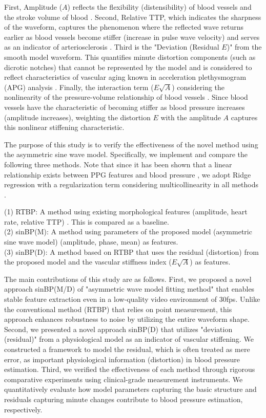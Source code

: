 \documentclass[fleqn,10pt,twocolumn]{AROB}
\begin{document}
First, Amplitude ($A$) reflects the flexibility (distensibility) of blood vessels and the stroke volume of blood \cite{ref3,ref11}.
Second, Relative TTP, which indicates the sharpness of the waveform, captures the phenomenon where the reflected wave returns earlier as blood vessels become stiffer (increase in pulse wave velocity) and serves as an indicator of arteriosclerosis \cite{ref6,ref14}.
Third is the "Deviation (Residual $E$)" from the smooth model waveform. This quantifies minute distortion components (such as dicrotic notches) that cannot be represented by the model and is considered to reflect characteristics of vascular aging known in acceleration plethysmogram (APG) analysis \cite{ref13}.
Finally, the interaction term ($E\sqrt{A}$) considering the nonlinearity of the pressure-volume relationship of blood vessels \cite{ref15}. Since blood vessels have the characteristic of becoming stiffer as blood pressure increases (amplitude increases), weighting the distortion $E$ with the amplitude $A$ captures this nonlinear stiffening characteristic.

The purpose of this study is to verify the effectiveness of the novel method using the asymmetric sine wave model. Specifically, we implement and compare the following three methods. Note that since it has been shown that a linear relationship exists between PPG features and blood pressure \cite{ref6,ref9,ref10}, we adopt Ridge regression with a regularization term considering multicollinearity in all methods \cite{ref12}.

\noindent
(1) RTBP: A method using existing morphological features (amplitude, heart rate, relative TTP) \cite{ref6}. This is compared as a baseline.\\[0.5em]
(2) sinBP(M): A method using parameters of the proposed model (asymmetric sine wave model) (amplitude, phase, mean) as features.\\[0.5em]
(3) sinBP(D): A method based on RTBP that uses the residual (distortion) from the proposed model and the vascular stiffness index ($E\sqrt{A}$) as features.

The main contributions of this study are as follows.
First, we proposed a novel approach sinBP(M/D) of "asymmetric  wave model fitting method" that enables stable feature extraction even in a low-quality video environment of 30fps. Unlike the conventional method (RTBP) that relies on point measurement, this approach enhances robustness to noise by utilizing the entire waveform shape.
Second, we presented a novel approach sinBP(D) that utilizes "deviation (residual)" from a physiological model as an indicator of vascular stiffening. We constructed a framework to model the residual, which is often treated as mere error, as important physiological information (distortion) in blood pressure estimation.
Third, we verified the effectiveness of each method through rigorous comparative experiments using clinical-grade measurement instruments. We quantitatively evaluate how model parameters capturing the basic structure and residuals capturing minute changes contribute to blood pressure estimation, respectively.
\end{document}
